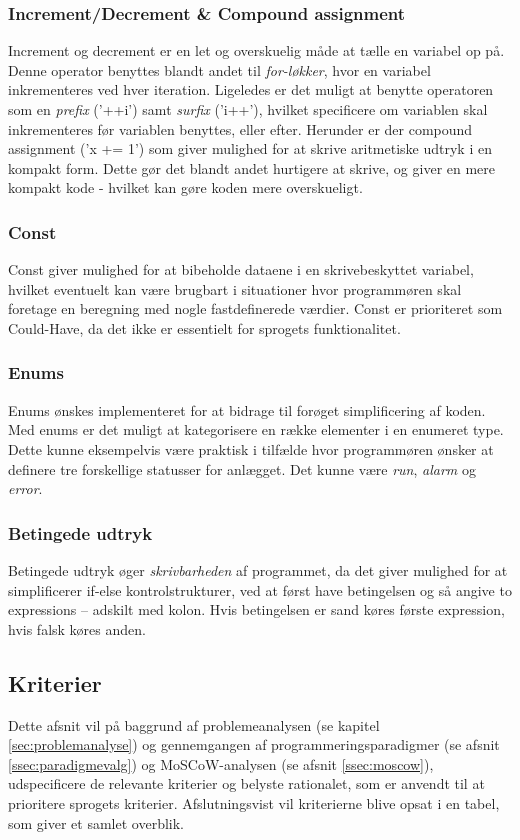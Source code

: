 \subsubsection{Increment/Decrement \& Compound assignment} 
Increment og decrement er en let og overskuelig måde at tælle en variabel op på.
Denne operator benyttes blandt andet til \textit{for-løkker}, hvor en variabel inkrementeres ved hver iteration.
Ligeledes er det muligt at benytte operatoren som en \textit{prefix} ('++i') samt \textit{surfix} ('i++'), hvilket specificere om variablen skal inkrementeres før variablen benyttes, eller efter.
Herunder er der compound assignment ('x += 1') som giver mulighed for at skrive aritmetiske udtryk i en kompakt form. Dette gør det blandt andet hurtigere at skrive, og giver en mere kompakt kode - hvilket kan gøre koden mere overskueligt.

\subsubsection{Const}
Const giver mulighed for at bibeholde dataene i en skrivebeskyttet variabel, hvilket eventuelt kan være brugbart i situationer hvor programmøren skal foretage en beregning med nogle fastdefinerede værdier. Const er prioriteret som Could-Have, da det ikke er essentielt for sprogets funktionalitet. 

\subsubsection{Enums} 
Enums ønskes implementeret for at bidrage til forøget simplificering af koden. Med enums er det muligt at kategorisere en række elementer i en enumeret type. Dette kunne eksempelvis være praktisk i tilfælde hvor programmøren ønsker at definere tre forskellige statusser for anlægget. Det kunne være \textit{run}, \textit{alarm} og \textit{error}.

\subsubsection{Betingede udtryk}
Betingede udtryk øger \textit{skrivbarheden} af programmet, da det giver mulighed for at simplificerer if-else kontrolstrukturer, ved at først have betingelsen og så angive to expressions – adskilt med kolon. Hvis betingelsen er sand køres første expression, hvis falsk køres anden. 

\subsection{Kriterier}
Dette afsnit vil på baggrund af problemeanalysen (se kapitel \ref{sec:problemanalyse}) og gennemgangen af programmeringsparadigmer (se afsnit \ref{ssec:paradigmevalg}) og MoSCoW-analysen (se afsnit \ref{ssec:moscow}), udspecificere de relevante kriterier og belyste rationalet, som er anvendt til at prioritere sprogets kriterier. Afslutningsvist vil kriterierne blive opsat i en tabel, som giver et samlet overblik. 

